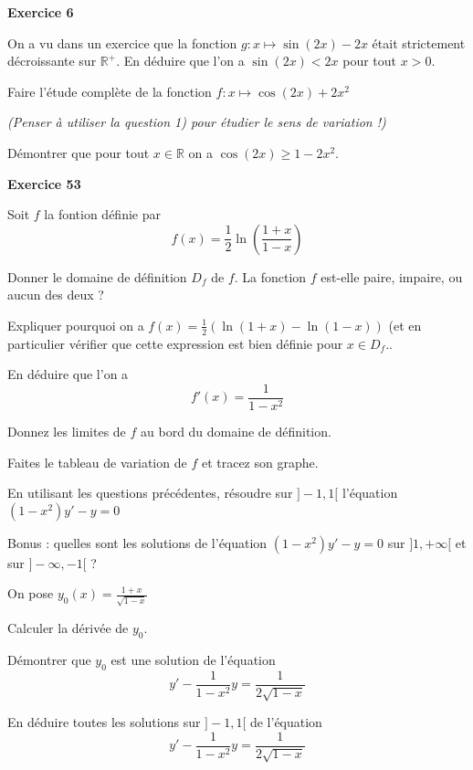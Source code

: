 ﻿\documentclass[11pt,a4paper]{amsart}
\theoremstyle{theorem}
\theoremstyle{definition}
\def\RR{{\mathbb R}}
\newcounter{qcounter}
\newcounter{qscounter}
\begin{document}
\everymath{\displaystyle}\textbf{Exercice 6}


\question On a vu dans un exercice que la fonction $g:x\mapsto \sin(2x)-2x$ était strictement décroissante sur $\RR^+$. En déduire que l'on a $\sin(2x)<2x$ pour tout $x>0$.


\question Faire l'étude complète de la fonction $f:x\mapsto \cos(2x)+2x^2$

\textit{(Penser à utiliser la question 1) pour étudier le sens de variation !)}

\question Démontrer que pour tout $x\in \RR$ on a $\cos(2x)\geq 1-2x^2$.


\setcounter{qcounter}{0} \setcounter{qscounter}{0}\textbf{Exercice 53}

Soit $f$ la fontion définie par $$f(x)=\frac12\ln(\frac{1+x}{1-x})$$

\question Donner le domaine de définition $D_f$ de $f$. La fonction $f$ est-elle paire, impaire, ou aucun des deux ?

\question

\squestion Expliquer pourquoi on a $f(x)=\frac{1}{2}(\ln(1+x)-\ln(1-x))$ (et en particulier vérifier que cette expression est bien définie pour $x\in D_f$..

\squestion En déduire que l'on a $$f'(x)=\frac{1}{1-x^2}$$

\question Donnez les limites de $f$ au bord du domaine de définition.

\question Faites le tableau de variation de $f$ et tracez son graphe.



\question En utilisant les questions précédentes, résoudre sur $]-1,1[$ l'équation $(1-x^2)y'-y=0$

\question Bonus : quelles sont les solutions de l'équation $(1-x^2)y'-y=0$ sur $]1,+\infty[$ et sur $]-\infty,-1[$ ?

\question On pose $y_0(x)=\frac{1+x}{\sqrt{1-x}}$

 \squestion Calculer la dérivée de $y_0$.
 
\squestion Démontrer que $y_0$ est une solution de l'équation 
$$y'-\frac{1}{1-x^2} y=\frac{1}{2\sqrt{1-x}}$$

\squestion En déduire toutes les solutions sur $]-1,1[$ de l'équation $$y'-\frac{1}{1-x^2} y=\frac{1}{2\sqrt{1-x}}$$
\end{document}
